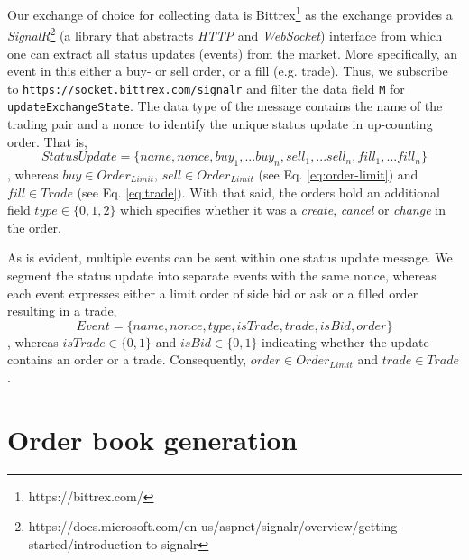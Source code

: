 Our exchange of choice for collecting data is Bittrex\footnote{https://bittrex.com/} as the exchange provides a \textit{SignalR}\footnote{https://docs.microsoft.com/en-us/aspnet/signalr/overview/getting-started/introduction-to-signalr} (a library that abstracts \textit{HTTP} and \textit{WebSocket}) interface from which one can extract all status updates (events) from the market.
More specifically, an event in this either a buy- or sell order, or a fill (e.g. trade).
Thus, we subscribe to \texttt{https://socket.bittrex.com/signalr} and filter the data field \texttt{M} for \texttt{updateExchangeState}.
The data type of the message contains the name of the trading pair and a nonce to identify the unique status update in up-counting order.
That is,
\begin{equation}
    StatusUpdate = \{name, nonce, buy_1,...buy_n, sell_1,...sell_n, fill_1,...fill_n\}
\end{equation}
, whereas $buy \in Order_{Limit}$, $sell \in Order_{Limit}$ (see Eq. \ref{eq:order-limit}) and $fill \in Trade$ (see Eq. \ref{eq:trade}).
With that said, the orders hold an additional field $type \in \{0,1,2\}$ which specifies whether it was a \textit{create}, \textit{cancel} or \textit{change} in the order.

As is evident, multiple events can be sent within one status update message. 
We segment the status update into separate events with the same nonce, whereas each event expresses either a limit order of side bid or ask or a filled order resulting in a trade,
\begin{equation}\label{eq:event-update}
    Event = \{name, nonce, type, isTrade, trade, isBid, order\}
\end{equation}
, whereas $isTrade \in \{0,1\}$ and $isBid \in \{0,1\}$ indicating whether the update contains an order or a trade. 
Consequently, $order \in Order_{Limit}$ and $trade \in Trade$.

\section{Order book generation}
\label{sec:data-generation}

